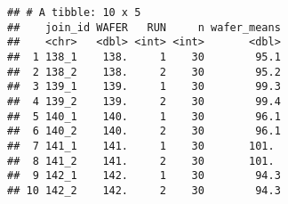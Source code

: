 \documentclass[]{book}
\newenvironment{Shaded}{\begin{snugshade}}{\end{snugshade}}
\newcommand{\DataTypeTok}[1]{\textcolor[rgb]{0.13,0.29,0.53}{#1}}
\newcommand{\KeywordTok}[1]{\textcolor[rgb]{0.13,0.29,0.53}{\textbf{#1}}}
\newcommand{\NormalTok}[1]{#1}
\newcommand{\OperatorTok}[1]{\textcolor[rgb]{0.81,0.36,0.00}{\textbf{#1}}}
\newcommand{\OtherTok}[1]{\textcolor[rgb]{0.56,0.35,0.01}{#1}}
\newcommand{\StringTok}[1]{\textcolor[rgb]{0.31,0.60,0.02}{#1}}
\theoremstyle{definition}
\theoremstyle{definition}
\theoremstyle{definition}
\theoremstyle{remark}
\begin{document}
\begin{Shaded}
\end{Shaded}

\begin{verbatim}
## # A tibble: 10 x 5
##    join_id WAFER   RUN     n wafer_means
##    <chr>   <dbl> <int> <int>       <dbl>
##  1 138_1    138.     1    30        95.1
##  2 138_2    138.     2    30        95.2
##  3 139_1    139.     1    30        99.3
##  4 139_2    139.     2    30        99.4
##  5 140_1    140.     1    30        96.1
##  6 140_2    140.     2    30        96.1
##  7 141_1    141.     1    30       101. 
##  8 141_2    141.     2    30       101. 
##  9 142_1    142.     1    30        94.3
## 10 142_2    142.     2    30        94.3
\end{verbatim}

\begin{Shaded}
\end{Shaded}
\end{document}
